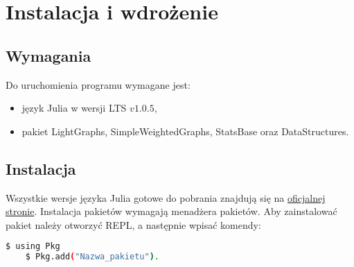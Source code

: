 \chapter{Instalacja i wdrożenie}
\thispagestyle{chapterBeginStyle}


\section{Wymagania}

Do uruchomienia programu wymagane jest:
\begin{itemize}
    \item język Julia w wersji LTS $v1.0.5$,
    \item pakiet LightGraphs, SimpleWeightedGraphs, StatsBase oraz DataStructures.
\end{itemize}

\section{Instalacja}

Wszystkie wersje języka Julia gotowe do pobrania znajdują się na \href{https://julialang.org/downloads/}{oficjalnej stronie}. Instalacja pakietów wymagają menadżera pakietów. Aby zainstalować pakiet należy otworzyć REPL, a następnie wpisać komendy:
\begin{lstlisting}[language=bash]
    $ using Pkg
    $ Pkg.add("Nazwa_pakietu").
\end{lstlisting}